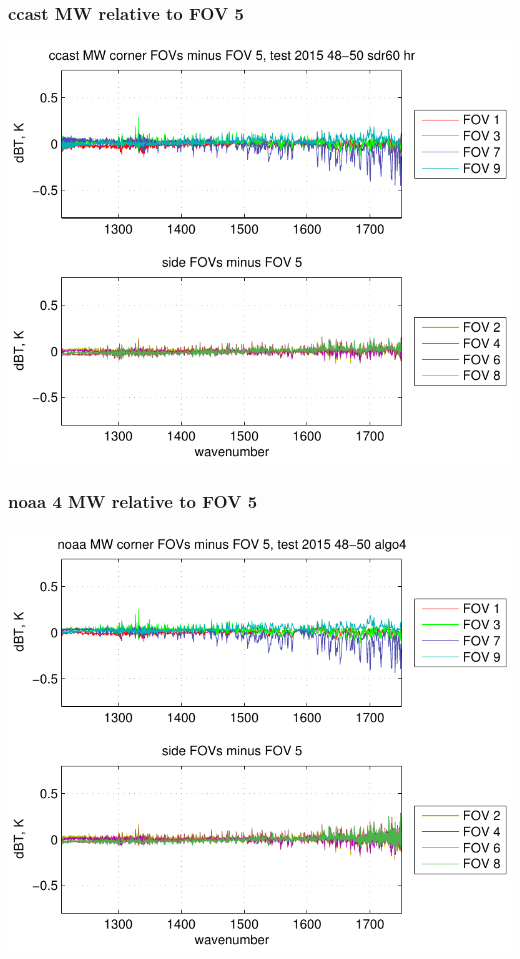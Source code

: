 \documentclass[11pt]{beamer}
\begin{document}
\begin{frame}
\frametitle{ccast MW relative to FOV 5}
\begin{center}
  \includegraphics[scale=0.7]{figures/ccast_MW_dif_2015_48-50_sdr60_hr.pdf}
\end{center}
\end{frame}
\begin{frame}
\frametitle{noaa 4 MW relative to FOV 5}
\begin{center}
  \includegraphics[scale=0.7]{figures/noaa_MW_dif_2015_48-50_algo4.pdf}
\end{center}
\end{frame}
\end{document}

